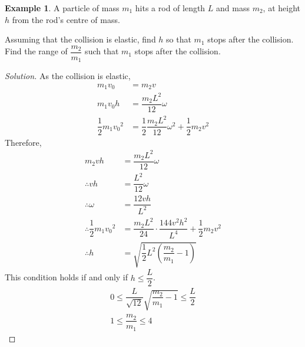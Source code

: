 \documentclass[fleqn, a4paper, 12pt]{article}
\theoremstyle{definition}
\newtheorem{example}{Example}
\theoremstyle{theorem}
\newenvironment{solution}
{\begin{proof}[Solution]\let\qed\relax}
	{\end{proof}}
\begin{document}
\begin{example}
	A particle of mass $m_1$ hits a rod of length $L$ and mass $m_2$, at height $h$ from the rod's centre of mass.\\
	\begin{figure}[H]
	\end{figure}
	Assuming that the collision is elastic, find $h$ so that $m_1$ stops after the collision. Find the range of $\dfrac{m_2}{m_1}$ such that $m_1$ stops after the collision.
\end{example}

\begin{solution}
	As the collision is elastic,
	\begin{align*}
		m_1 v_0 &= m_2 v\\
		m_1 v_0 h &= \dfrac{m_2 L^2}{12} \omega\\
		\dfrac{1}{2} m_1 {v_0}^2 &= \dfrac{1}{2} \dfrac{m_2 L^2}{12} \omega^2 + \dfrac{1}{2} m_2 v^2
	\end{align*}
	Therefore,
	\begin{align*}
		m_2 v h &= \dfrac{m_2 L^2}{12} \omega\\
		\therefore v h &= \dfrac{L^2}{12} \omega\\
		\therefore \omega &= \dfrac{12 v h}{L^2}\\
		\therefore \dfrac{1}{2} m_1 {v_0}^2 &= \dfrac{m_2 L^2}{24} \cdot \dfrac{144 v^2 h^2}{L^4} + \dfrac{1}{2} m_2 v^2\\
		\therefore h &= \sqrt{\dfrac{1}{2} L^2 \left( \dfrac{m_2}{m_1} - 1 \right)}
	\end{align*}
	This condition holds if and only if $h \leq \dfrac{L}{2}$.
	\begin{align*}
		0 \leq \dfrac{L}{\sqrt{12}} \sqrt{\dfrac{m_2}{m_1} - 1} \leq \dfrac{L}{2}\\
		1 \leq \dfrac{m_2}{m_1} \leq 4
	\end{align*}
\end{solution}
\end{document}
